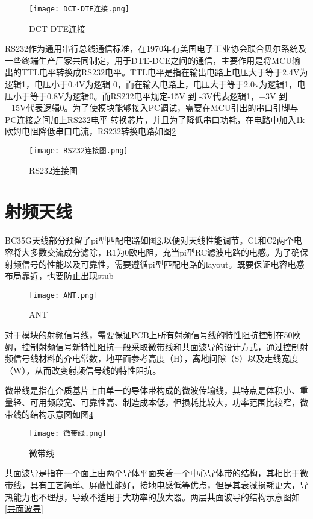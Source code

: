 \begin{figure}[H]
	\centering
	\texttt{[image: DCT-DTE连接.png]}
	\caption{DCT-DTE连接}
	\label{DCT-DTE连接}
\end{figure}

RS232作为通用串行总线通信标准，在1970年有美国电子工业协会联合贝尔系统及一些终端生产厂家共同制定，用于DTE-DCE之间的通信，主要作用是将MCU输出的TTL电平转换成RS232电平。TTL电平是指在输出电路上电压大于等于2.4V为逻辑1，电压小于0.4V为逻辑
0，而在输入电路上，电压大于等于2.0v为逻辑1，电压小于等于0.8V为逻辑0。而RS232电平规定-15V 到 -3V代表逻辑1，+3V 到 +15V代表逻辑0。为了使模块能够接入PC调试，需要在MCU引出的串口引脚与PC连接之间加上RS232电平
转换芯片，并且为了降低串口功耗，在电路中加入1k欧姆电阻降低串口电流，RS232转换电路如图\ref{RS232连接图}

\begin{figure}[H]
	\centering
	\texttt{[image: RS232连接图.png]}
	\caption{RS232连接图}
	\label{RS232连接图}
\end{figure}

\section{射频天线}
BC35G天线部分预留了pi型匹配电路如图\ref{ANT},以便对天线性能调节。C1和C2两个电容将大多数交流成分滤除，R1为0欧电阻，充当pi型RC滤波电路的电感。为了确保射频信号的性能以及可靠性，需要遵循pi型匹配电路的layout。既要保证电容电感布局靠近，也要防止出现stub\cite{OKgagaga,stubeffect}
\begin{figure}[H]
	\centering
	\texttt{[image: ANT.png]}
	\caption{ANT}
	\label{ANT}
\end{figure}

对于模块的射频信号线，需要保证PCB上所有射频信号线的特性阻抗控制在50欧姆，控制射频信号新特性阻抗一般采取微带线和共面波导的设计方式，通过控制射频信号线材料的介电常数，地平面参考高度（H），离地间隙（S）以及走线宽度（W），从而改变射频信号线的特性阻抗。

微带线是指在介质基片上由单一的导体带构成的微波传输线，其特点是体积小、重量轻、可用频段宽、可靠性高、制造成本低，但损耗比较大，功率范围比较窄，微带线的结构示意图如图\ref{微带线}

\begin{figure}[H]
	\centering
	\texttt{[image: 微带线.png]}
	\caption{微带线}
	\label{微带线}
\end{figure}

共面波导是指在一个面上由两个导体平面夹着一个中心导体带的结构，其相比于微带线，具有工艺简单、屏蔽性能好，接地电感低等优点，但是其衰减损耗更大，导热能力也不理想，导致不适用于大功率的放大器。两层共面波导的结构示意图如\ref{共面波导}

